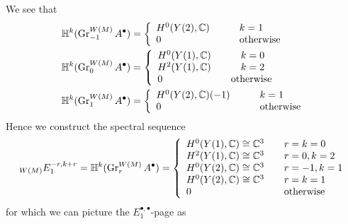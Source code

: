 \documentclass[../main.tex]{subfiles}
\begin{document}
\begin{es}
We see that 
\begin{align*}
 \mathbb{H}^k(\operatorname{Gr}^{W(M)}_{-1} A^\bullet) &= 
    \left\{\begin{array}{ll} 
 H^0(Y(2),\mathbb{C}) &\quad \quad k = 1 \\ 
0 &\quad \quad \text{otherwise}  \end{array}\right.\\ 
    \mathbb{H}^k(\operatorname{Gr}^{W(M)}_0 A^\bullet) &= 
    \left\{\begin{array}{ll} 
 H^0(Y(1),\mathbb{C}) &\quad \quad k = 0 \\ 
  H^2(Y(1),\mathbb{C}) &\quad \quad k = 2 \\ 
0 &\quad \text{otherwise}  \end{array}\right.\\  \mathbb{H}^k(\operatorname{Gr}^{W(M)}_1 A^\bullet) &= 
    \left\{\begin{array}{ll} 
 H^0(Y(2),\mathbb{C})(-1) &\quad \quad k = 1 \\ 
0 &\quad \quad \text{otherwise}  \end{array}\right.\\
\end{align*}
Hence we construct the spectral sequence 
\[
 {}_{W(M)}{}{E_1^{-r,k+r}}= \mathbb{H}^k(\operatorname{Gr}^{W(M)}_r A^\bullet)  = 
    \left\{\begin{array}{ll} 
 H^0(Y(1),\mathbb{C}) \cong \mathbb{C}^3 &\quad r = k = 0 \\ 
 H^2(Y(1),\mathbb{C}) \cong \mathbb{C}^3 &\quad r = 0, k = 2 \\
 H^0(Y(2),\mathbb{C}) \cong \mathbb{C}^3 &\quad r = -1, k = 1 \\
  H^0(Y(2),\mathbb{C}) \cong \mathbb{C}^3 &\quad r = k = 1 \\
0 &\quad \text{otherwise}  \end{array}\right.
\]
for which we can picture the $E_1^{\bullet,\bullet}$-page as 
\begin{center}
\end{center}
\end{es}
\end{document}
